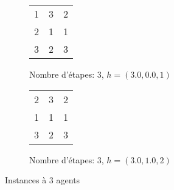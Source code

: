 \documentclass[a4paper, 10pt]{article}
\newcommand{\bb}[1]{\colorbox{blue!30}{#1}}
\begin{document}
\begin{figure}[h]
	\centering
\begin{subfigure}[h]{0.45\textwidth}
	\centering
	\begin{tabular}{|c c c|}
		\hline
		\bb{1} & \bb{3} & \bb{2} \\
		2 & 1 & 1 \\
		3 & 2 & 3 \\
		\hline
	\end{tabular}
	\caption{Nombre d'étapes: 3, $h = (3.0, 0.0, 1)$}
\end{subfigure}
\begin{subfigure}[h]{0.45\textwidth}
	\centering
	\begin{tabular}{|c c c|}
		\hline
		\bb{2} & \bb{3} & 2 \\
		1 & 1 & \bb{1} \\
		3 & 2 & 3 \\
		\hline
	\end{tabular}
	\caption{Nombre d'étapes: 3, $h = (3.0, 1.0, 2)$}
\end{subfigure}
\caption{Instances à 3 agents}
\end{figure}
\end{document}
